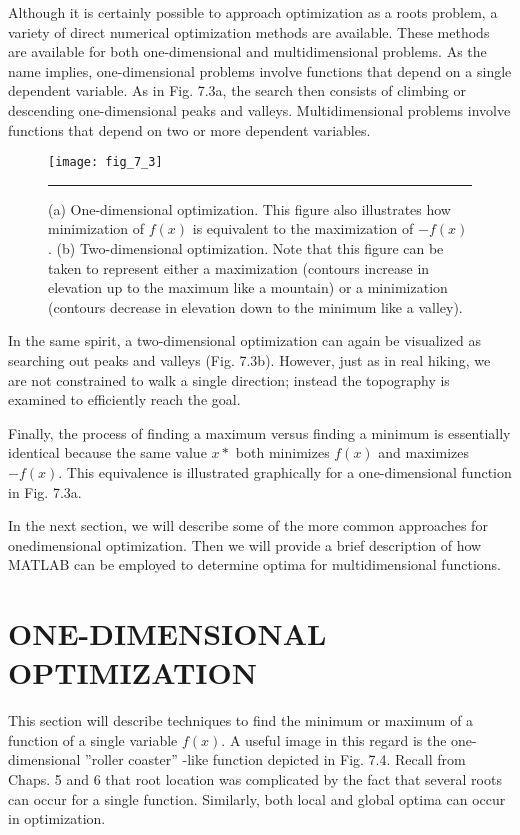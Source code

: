 \documentclass[../main.tex]{subfiles}
\begin{document}
\color{black}

Although it is certainly possible to approach optimization as a roots problem, a variety
of direct numerical optimization methods are available. These methods are available for both
one-dimensional and multidimensional problems. As the name implies, one-dimensional
problems involve functions that depend on a single dependent variable. As in Fig. 7.3a, the
search then consists of climbing or descending one-dimensional peaks and valleys. Multidimensional
problems involve functions that depend on two or more dependent variables.

\begin{figure}[H]
	\centering
	\texttt{[image: fig\_7\_3]}
	\caption{\textsf{(a) One-dimensional optimization. This figure also illustrates how minimization of $f(x)$ is
	equivalent to the maximization of $-f(x)$. (b) Two-dimensional optimization. Note that this
	figure can be taken to represent either a maximization (contours increase in elevation up to
	the maximum like a mountain) or a minimization (contours decrease in elevation down to the
	minimum like a valley).}}
	\color{cyan} \rule{\linewidth}{0,5mm}
	\label{fig:fig_7_3}
\end{figure}

In the same spirit, a two-dimensional optimization can again be visualized as searching out
peaks and valleys (Fig. 7.3b). However, just as in real hiking, we are not constrained to walk
a single direction; instead the topography is examined to efficiently reach the goal.

Finally, the process of finding a maximum versus finding a minimum is essentially
identical because the same value $x*$ both minimizes $f(x)$ and maximizes $-f(x)$. This
equivalence is illustrated graphically for a one-dimensional function in Fig. 7.3a.

In the next section, we will describe some of the more common approaches for onedimensional
optimization. Then we will provide a brief description of how MATLAB can
be employed to determine optima for multidimensional functions.\bigskip


\section{ONE-DIMENSIONAL OPTIMIZATION}
\label{sec:sec_7_2}

This section will describe techniques to find the minimum or maximum of a function of a
single variable $f(x)$. A useful image in this regard is the one-dimensional ''roller
coaster'' -like function depicted in Fig. 7.4. Recall from Chaps. 5 and 6 that root location
was complicated by the fact that several roots can occur for a single function. Similarly,
both local and global optima can occur in optimization.
\end{document}

